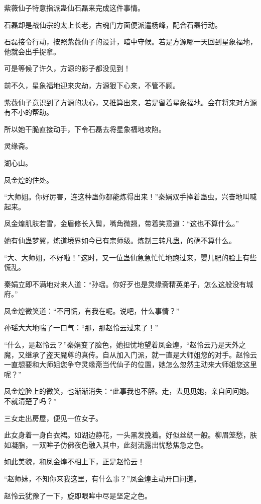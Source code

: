 \begin{this_body}
紫薇仙子特意指派蛊仙石磊来完成这件事情。

石磊却是战仙宗的太上长老，古魂门方面便派遣杨峰，配合石磊行动。

石磊接令行动，按照紫薇仙子的设计，暗中守候。若是方源哪一天回到星象福地，他就会出手捉拿。

可是等候了许久，方源的影子都没见到！

前不久，星象福地迎来灾劫，方源狠下心来，不管不顾。

紫薇仙子意识到了方源的决心，又推算出来，若是留着星象福地。会在将来对方源有不小的帮助。

所以她干脆直接动手，下令石磊去将星象福地攻陷。

灵缘斋。

湖心山。

凤金煌的住处。

“大师姐。你好厉害，连这种蛊你都能炼得出来！”秦娟双手捧着蛊虫。兴奋地叫喊起来。

凤金煌肌肤若雪，金眉修长入鬓，嘴角微翘，带着笑意道：“这也不算什么。”

她有仙蛊梦翼，炼道境界如今已有宗师级。炼制三转凡蛊，的确不算什么。

“大、大师姐，不好啦！”这时，又一位蛊仙急急忙忙地跑过来，婴儿肥的脸上有些慌乱。

秦娟立即不满地对来人道：“孙瑶。你好歹也是灵缘斋精英弟子，怎么这般没有城府。”

凤金煌微笑道：“不用慌，有我在呢。说吧，什么事情？”

孙瑶大大地喘了一口气：“那，那赵怜云过来了！”

“什么，是赵怜云？”秦娟变了脸色，她担忧地望着凤金煌，“赵怜云乃是天外之魔，又继承了盗天魔尊的真传。自从加入门派，就一直是大师姐您的对手。赵怜云一直想要和大师姐您争夺灵缘斋当代仙子的位置，她怎么忽然主动来大师姐您这里呢？”

凤金煌脸上的微笑，也渐渐消失：“此事我也不解。走，去见见她，亲自问问她。不就清楚了吗？”

三女走出房屋，便见一位女子。

此女身着一身白衣裙。如湖边静花，一头黑发挽着。好似丝绸一般。柳眉笼愁，肤如凝脂，一双眸子仿佛夜色融入其中，此刻流露出忧愁焦急之色。

如此美貌，和凤金煌不相上下，正是赵怜云！

“赵师妹，不知你来我这里，有什么事？”凤金煌主动开口问道。

赵怜云犹豫了一下，旋即眼眸中尽是坚定之色。


\end{this_body}
